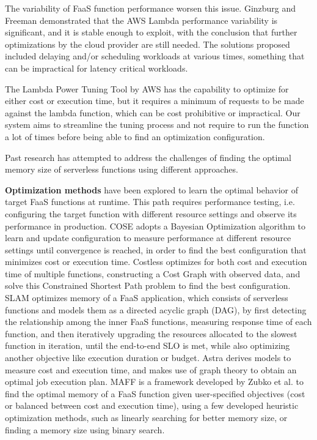 \documentclass[conference]{IEEEtran}
\begin{document}
The variability of FaaS function performance worsen this issue. Ginzburg and Freeman \cite{10.1145/3429880.3430099} demonstrated that the AWS Lambda performance variability is significant, and it is stable enough to exploit, with the conclusion that further optimizations by the cloud provider are still needed. The solutions proposed included delaying and/or scheduling workloads at various times, something that can be impractical for latency critical workloads. 

The Lambda Power Tuning Tool by AWS \cite{aws_lambda_power_tuning} has the capability to optimize for either cost or execution time, but it requires a minimum of requests to be made against the lambda function, which can be cost prohibitive or impractical. Our system aims to streamline the tuning process and not require to run the function a lot of times before being able to find an optimization configuration.

Past research has attempted to address the challenges of finding the optimal memory size of serverless functions using different approaches.

\textbf{Optimization methods} have been explored to learn the optimal behavior of target FaaS functions at runtime. This path requires performance testing, i.e. configuring the target function with different resource settings and observe its performance in production. COSE \cite{9155363} adopts a Bayesian Optimization algorithm to learn and update configuration to measure performance at different resource settings until convergence is reached, in order to find the best configuration that minimizes cost or execution time. Costless \cite {8567674} optimizes for both cost and execution time of multiple functions, constructing a Cost Graph with observed data, and solve this Constrained Shortest Path problem to find the best configuration. SLAM \cite{9860980} optimizes memory of a FaaS application, which consists of serverless functions and models them as a directed acyclic graph (DAG), by first detecting the relationship among the inner FaaS functions, measuring response time of each function, and then iteratively upgrading the resources allocated to the slowest function in iteration, until the end-to-end SLO is met, while also optimizing another objective like execution duration or budget. Astra \cite{9460548} derives models to measure cost and execution time, and makes use of graph theory to obtain an optimal job execution plan. MAFF\cite{10.1007/978-3-031-04718-3_9} is a framework developed by Zubko et al. to find the optimal memory of a FaaS function given user-specified objectives (cost or balanced between cost and execution time), using a few developed heuristic optimization methods, such as linearly searching for better memory size, or finding a memory size using binary search.
\end{document}

